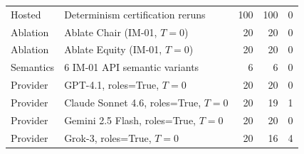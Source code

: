 \documentclass[11pt,onecolumn]{article}
\begin{document}
\begin{table}[H]
\begin{tabular}{@{}llrrr@{}}
Hosted    & Determinism certification reruns          & 100 & 100 & 0 \\
Ablation  & Ablate Chair (IM-01, $T=0$)             & 20 & 20 & 0 \\
Ablation  & Ablate Equity (IM-01, $T=0$)            & 20 & 20 & 0 \\
Semantics & 6 IM-01 API semantic variants           & 6  & 6  & 0 \\
Provider  & GPT-4.1, roles=True, $T=0$              & 20 & 20 & 0 \\
Provider  & Claude Sonnet 4.6, roles=True, $T=0$    & 20 & 19 & 1 \\
Provider  & Gemini 2.5 Flash, roles=True, $T=0$     & 20 & 20 & 0 \\
Provider  & Grok-3, roles=True, $T=0$               & 20 & 16 & 4 \\
\bottomrule
\end{tabular}
\end{table}
\end{document}
